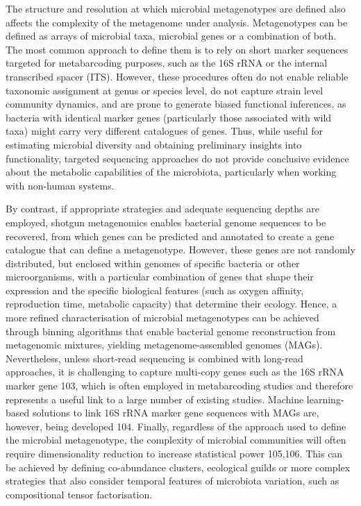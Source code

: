 \documentclass[
]{book}
\begin{document}
The structure and resolution at which microbial metagenotypes are defined also affects the complexity of the metagenome under analysis. Metagenotypes can be defined as arrays of microbial taxa, microbial genes or a combination of both. The most common approach to define them is to rely on short marker sequences targeted for metabarcoding purposes, such as the 16S rRNA or the internal transcribed spacer (ITS). However, these procedures often do not enable reliable taxonomic assignment at genus or species level, do not capture strain level community dynamics, and are prone to generate biased functional inferences, as bacteria with identical marker genes (particularly those associated with wild taxa) might carry very different catalogues of genes. Thus, while useful for estimating microbial diversity and obtaining preliminary insights into functionality, targeted sequencing approaches do not provide conclusive evidence about the metabolic capabilities of the microbiota, particularly when working with non-human systems.

By contrast, if appropriate strategies and adequate sequencing depths are employed, shotgun metagenomics enables bacterial genome sequences to be recovered, from which genes can be predicted and annotated to create a gene catalogue that can define a metagenotype. However, these genes are not randomly distributed, but enclosed within genomes of specific bacteria or other microorganisms, with a particular combination of genes that shape their expression and the specific biological features (such as oxygen affinity, reproduction time, metabolic capacity) that determine their ecology. Hence, a more refined characterisation of microbial metagenotypes can be achieved through binning algorithms that enable bacterial genome reconstruction from metagenomic mixtures, yielding metagenome-assembled genomes (MAGs). Nevertheless, unless short-read sequencing is combined with long-read approaches, it is challenging to capture multi-copy genes such as the 16S rRNA marker gene 103, which is often employed in metabarcoding studies and therefore represents a useful link to a large number of existing studies. Machine learning-based solutions to link 16S rRNA marker gene sequences with MAGs are, however, being developed 104. Finally, regardless of the approach used to define the microbial metagenotype, the complexity of microbial communities will often require dimensionality reduction to increase statistical power 105,106. This can be achieved by defining co-abundance clusters, ecological guilds or more complex strategies that also consider temporal features of microbiota variation, such as compositional tensor factorisation.
\end{document}
